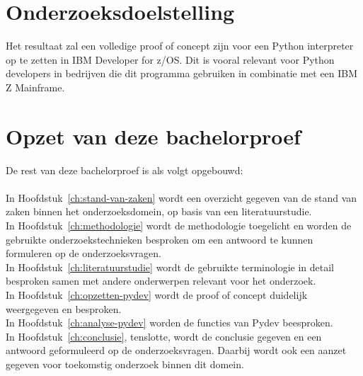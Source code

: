 \section{Onderzoeksdoelstelling}%
\label{sec:onderzoeksdoelstelling}

Het resultaat zal een volledige proof of concept zijn voor een Python interpreter op te zetten in IBM Developer for z/OS. Dit is vooral relevant voor Python developers in bedrijven die dit programma gebruiken in combinatie met een IBM Z Mainframe. 

\section{Opzet van deze bachelorproef}%
\label{sec:opzet-bachelorproef}


De rest van deze bachelorproef is als volgt opgebouwd: \\ \\

In Hoofdstuk~\ref{ch:stand-van-zaken} wordt een overzicht gegeven van de stand van zaken binnen het onderzoeksdomein, op basis van een literatuurstudie. \\

In Hoofdstuk~\ref{ch:methodologie} wordt de methodologie toegelicht en worden de gebruikte onderzoekstechnieken besproken om een antwoord te kunnen formuleren op de onderzoeksvragen. \\

In Hoofdstuk~\ref{ch:literatuurstudie} wordt de gebruikte terminologie in detail besproken samen met andere onderwerpen relevant voor het onderzoek. \\

In Hoofdstuk~\ref{ch:opzetten-pydev} wordt de proof of concept duidelijk weergegeven en besproken. \\

In Hoofdstuk~\ref{ch:analyse-pydev} worden de functies van Pydev beesproken. \\

In Hoofdstuk~\ref{ch:conclusie}, tenslotte, wordt de conclusie gegeven en een antwoord geformuleerd op de onderzoeksvragen. Daarbij wordt ook een aanzet gegeven voor toekomstig onderzoek binnen dit domein. \\